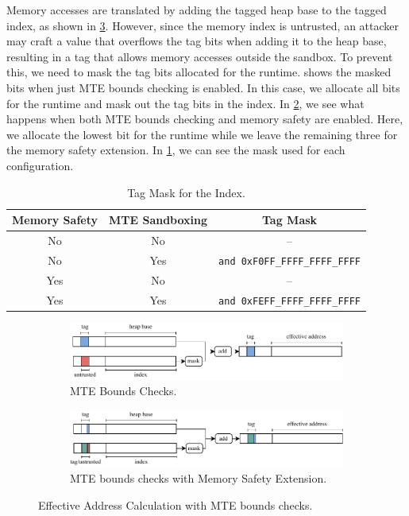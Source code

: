 Memory accesses are translated by adding the tagged heap base to the tagged index, as shown in \cref{fig:system-design-mem-safety-bounds}.
However, since the memory index is untrusted, an attacker may craft a value that overflows the tag bits when adding it to the heap base, resulting in a tag that allows memory accesses outside the sandbox.
To prevent this, we need to mask the tag bits allocated for the runtime.
 shows the masked bits when just \ac{MTE} bounds checking is enabled.
In this case, we allocate all bits for the runtime and mask out the tag bits in the index.
In \cref{fig:mte-bounds-checks-mem-safety}, we see what happens when both \ac{MTE} bounds checking and memory safety are enabled.
Here, we allocate the lowest bit for the runtime while we leave the remaining three for the memory safety extension.
In \cref{tab:tag-mask}, we can see the mask used for each configuration.

\begin{table}
  \centering
  \begin{tabular}{c | c || c}
    \textbf{Memory Safety} & \textbf{MTE Sandboxing} & \textbf{Tag Mask} \\
    \hline
    No  & No  & -- \\
    No  & Yes & \texttt{and 0xF0FF\_FFFF\_FFFF\_FFFF} \\
    Yes & No  & -- \\
    Yes & Yes & \texttt{and 0xFEFF\_FFFF\_FFFF\_FFFF}
  \end{tabular}
  \caption{Tag Mask for the Index.}
  \label{tab:tag-mask}
\end{table}

\begin{figure}[t]
  \centering
  \begin{subfigure}[T]{\textwidth}
    \centering
    \includegraphics{figures/build/bounds}
    \caption{\ac{MTE} Bounds Checks.}
    \label{fig:mte-bounds-checks}
  \end{subfigure}
  \hfill
  \begin{subfigure}[T]{\textwidth}
    \centering
    \includegraphics{figures/build/bounds-mem-safety}
    \caption{\ac{MTE} bounds checks with Memory Safety Extension.}
    \label{fig:mte-bounds-checks-mem-safety}
  \end{subfigure}
  \caption{Effective Address Calculation with \ac{MTE} bounds checks.}
  \label{fig:system-design-mem-safety-bounds}
\end{figure}

